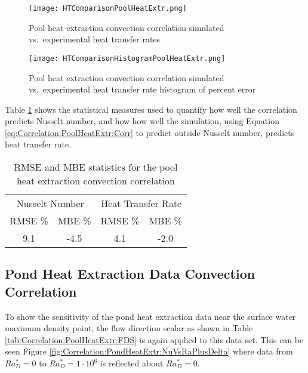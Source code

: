 	\begin{figure}
		\centering
		\texttt{[image: HTComparisonPoolHeatExtr.png]}
		\caption{Pool heat extraction convection correlation simulated vs.\ experimental heat transfer rates}
		\label{fig:Correlation:PoolHeatExtr:HTComparison}
	\end{figure}


	\begin{figure}
		\centering
		\texttt{[image: HTComparisonHistogramPoolHeatExtr.png]}
		\caption{Pool heat extraction convection correlation simulated vs.\ experimental heat transfer rate histogram of percent error}
		\label{fig:Correlation:PoolHeatExtr:HTComparisonHistogram}
	\end{figure}

Table \ref{tab:Correlation:PoolHeatExtr:StatSummaryTable} shows the statistical measures used to quantify how well the correlation predicts Nusselt number, and how how well the simulation, using Equation \ref{eq:Correlation:PoolHeatExtr:Corr} to predict outside Nusselt number, predicts heat transfer rate. 
	
	\begin{table}[h]
		\centering
		\caption{RMSE and MBE statistics for the pool heat extraction convection correlation}
		\label{tab:Correlation:PoolHeatExtr:StatSummaryTable}
		\begin{tabular}{c c c c}
		\hline
		\multicolumn{2}{c}{Nusselt Number} & \multicolumn{2}{c}{Heat Transfer Rate} \\
		RMSE \% & MBE \% & RMSE \% & MBE \% \\
		\hline\hline
		9.1 & -4.5 & 4.1 & -2.0 \\
		\hline		
		\end{tabular}
	\end{table}	


\subsection{Pond Heat Extraction Data Convection Correlation}

To show the sensitivity of the pond heat extraction data near the surface water maximum density point, the flow direction scalar as shown in Table \ref{tab:Correlation:PoolHeatExtr:FDS} is again applied to this data set. This can be seen Figure \ref{fig:Correlation:PondHeatExtr:NuVsRaPlusDelta} where data from $Ra_D^* = 0$ to $Ra_D^* = 1 \cdot 10^6$ is reflected about $Ra_D^* = 0$. 

